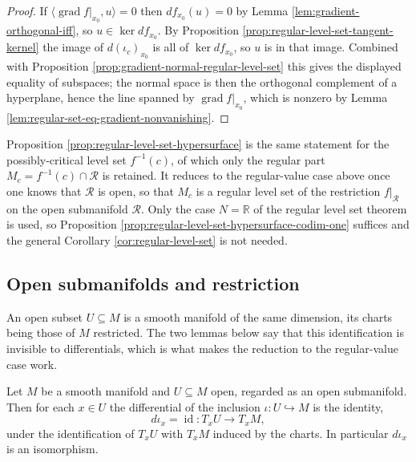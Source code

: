 \begin{proof}
\leanok
{}
If $\langle \operatorname{grad} f|_{x_0}, u\rangle = 0$ then $df_{x_0}(u) = 0$ by Lemma \ref{lem:gradient-orthogonal-iff}, so $u \in \ker df_{x_0}$. By Proposition \ref{prop:regular-level-set-tangent-kernel} the image of $d(\iota_c)_{x_0}$ is all of $\ker df_{x_0}$, so $u$ is in that image. Combined with Proposition \ref{prop:gradient-normal-regular-level-set} this gives the displayed equality of subspaces; the normal space is then the orthogonal complement of a hyperplane, hence the line spanned by $\operatorname{grad} f|_{x_0}$, which is nonzero by Lemma \ref{lem:regular-set-eq-gradient-nonvanishing}.
\end{proof}

Proposition \ref{prop:regular-level-set-hypersurface} is the same statement for the possibly-critical level set $f^{-1}(c)$, of which only the regular part $M_c = f^{-1}(c) \cap \mathcal{R}$ is retained. It reduces to the regular-value case above once one knows that $\mathcal{R}$ is open, so that $M_c$ is a regular level set of the restriction $f|_{\mathcal{R}}$ on the open submanifold $\mathcal{R}$. Only the case $N = \mathbb{R}$ of the regular level set theorem is used, so Proposition \ref{prop:regular-level-set-hypersurface-codim-one} suffices and the general Corollary \ref{cor:regular-level-set} is not needed.

\subsection*{Open submanifolds and restriction}

An open subset $U \subseteq M$ is a smooth manifold of the same dimension, its charts being those of $M$ restricted. The two lemmas below say that this identification is invisible to differentials, which is what makes the reduction to the regular-value case work.

\begin{lemma}
\label{lem:opens-inclusion-differential}
\leanok
Let $M$ be a smooth manifold and $U \subseteq M$ open, regarded as an open submanifold. Then for each $x \in U$ the differential of the inclusion $\iota : U \hookrightarrow M$ is the identity,
\[
  d\iota_x = \operatorname{id} : T_x U \to T_x M ,
\]
under the identification of $T_x U$ with $T_x M$ induced by the charts. In particular $d\iota_x$ is an isomorphism.
\end{lemma}

